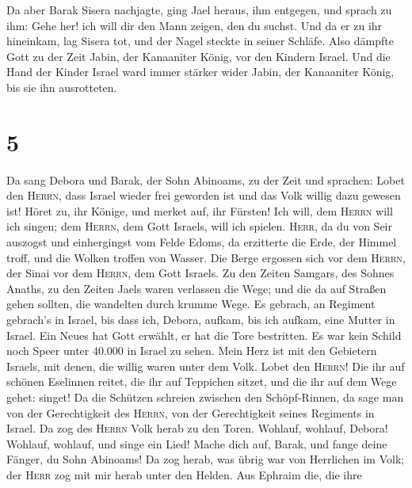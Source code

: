  Da aber Barak Sisera nachjagte, ging Jael heraus, ihm
entgegen, und sprach zu ihm: Gehe her! ich will dir den Mann zeigen, den
du suchst. Und da er zu ihr hineinkam, lag Sisera tot, und der Nagel
steckte in seiner Schläfe.  Also dämpfte Gott zu der Zeit
Jabin, der Kanaaniter König, vor den Kindern Israel.  Und
die Hand der Kinder Israel ward immer stärker wider Jabin, der
Kanaaniter König, bis sie ihn ausrotteten.

\hypertarget{section-4}{%
\section{5}\label{section-4}}

 Da sang Debora und Barak, der Sohn Abinoams, zu der Zeit
und sprachen:  Lobet den \textsc{Herrn}, dass Israel
wieder frei geworden ist und das Volk willig dazu gewesen ist!
 Höret zu, ihr Könige, und merket auf, ihr Fürsten! Ich
will, dem \textsc{Herrn} will ich singen; dem \textsc{Herrn}, dem Gott
Israels, will ich spielen.  \textsc{Herr}, da du von Seir
auszogst und einhergingst vom Felde Edoms, da erzitterte die Erde, der
Himmel troff, und die Wolken troffen von Wasser.  Die
Berge ergossen sich vor dem \textsc{Herrn}, der Sinai vor dem
\textsc{Herrn}, dem Gott Israels.  Zu den Zeiten Samgars,
des Sohnes Anaths, zu den Zeiten Jaels waren verlassen die Wege; und die
da auf Straßen gehen sollten, die wandelten durch krumme Wege.
 Es gebrach, an Regiment gebrach's in Israel, bis dass
ich, Debora, aufkam, bis ich aufkam, eine Mutter in Israel.
 Ein Neues hat Gott erwählt, er hat die Tore bestritten.
Es war kein Schild noch Speer unter 40.000 in Israel zu sehen.
 Mein Herz ist mit den Gebietern Israels, mit denen, die
willig waren unter dem Volk. Lobet den \textsc{Herrn}! 
Die ihr auf schönen Eselinnen reitet, die ihr auf Teppichen sitzet, und
die ihr auf dem Wege gehet: singet!  Da die Schützen
schreien zwischen den Schöpf-Rinnen, da sage man von der Gerechtigkeit
des \textsc{Herrn}, von der Gerechtigkeit seines Regiments in Israel. Da
zog des \textsc{Herrn} Volk herab zu den Toren.  Wohlauf,
wohlauf, Debora! Wohlauf, wohlauf, und singe ein Lied! Mache dich auf,
Barak, und fange deine Fänger, du Sohn Abinoams!  Da zog
herab, was übrig war von Herrlichen im Volk; der \textsc{Herr} zog mit
mir herab unter den Helden.  Aus Ephraim die, die ihre
